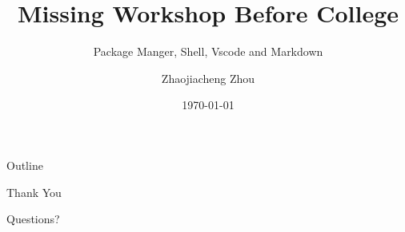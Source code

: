 \documentclass[10pt, colorlinks]{beamer}
\title{Missing Workshop Before College}
\subtitle{Package Manger, Shell, Vscode and Markdown}
\author{Zhaojiacheng Zhou}
\date{\today}
\institute{Tech GC}
\begin{document}
\frame{\titlepage}

\begin{frame}{Outline}
 \tableofcontents
\end{frame}









\begin{frame}{Thank You}
  \begin{center}
    {\Huge Questions?}
  \end{center}
\end{frame}
\end{document}
